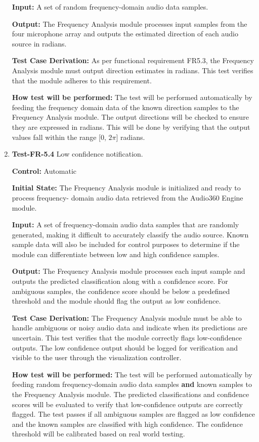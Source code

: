 \documentclass[12pt, titlepage]{article}
\begin{document}
\begin{enumerate}
\textbf{Input:}
A set of random frequency-domain audio data samples.

\textbf{Output:}
The Frequency Analysis module processes input samples from the four microphone
array and outputs the estimated direction of each audio source in radians.

\textbf{Test Case Derivation:}
As per functional requirement FR5.3, the Frequency Analysis module must
output direction estimates in radians. This test verifies that the module
adheres to this requirement.

\textbf{How test will be performed:}
The test will be performed automatically by feeding the frequency
domain data of the known direction samples to the Frequency Analysis module.
The output directions will be checked to ensure they are expressed in radians.
This will be done by verifying that the output values fall within the range
[0, \(2\pi\)] radians.

\item{\textbf{Test-FR-5.4} Low confidence notification.\\}

\textbf{Control:} Automatic

\textbf{Initial State:}
The Frequency Analysis module is initialized and ready to process frequency-
domain audio data retrieved from the Audio360 Engine module.

\textbf{Input:}
A set of frequency-domain audio data samples that are randomly generated,
making it difficult to accurately classify the audio source. Known sample
data will also be included for control purposes to determine if the module
can differentiate between low and high confidence samples.

\textbf{Output:}
The Frequency Analysis module processes each input sample and outputs
the predicted classification along with a confidence score. For ambiguous
samples, the confidence score should be below a predefined threshold and 
the module should flag the output as low confidence.

\textbf{Test Case Derivation:}
The Frequency Analysis module must be able to handle ambiguous or noisy
audio data and indicate when its predictions are uncertain. This test
verifies that the module correctly flags low-confidence outputs. The low
confidence output should be logged for verification and visible to the user
through the visualization controller.

\textbf{How test will be performed:}
The test will be performed automatically by feeding random frequency-domain 
audio data samples \textbf{and} known samples to the Frequency Analysis module.
The predicted classifications and confidence scores will be evaluated
to verify that low-confidence outputs are correctly flagged. The test passes
if all ambiguous samples are flagged as low confidence and the known samples
are classified with high confidence. The confidence threshold will be calibrated
based on real world testing. 

\end{enumerate}
\end{document}
